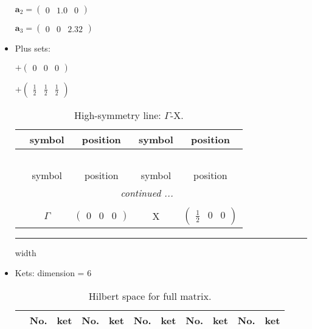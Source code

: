 \documentclass[fleqn,10pt,landscape]{article}
\begin{document}
\begin{itemize}
\quad $\bm{a}_2=\begin{pmatrix} 0 & 1.0 & 0 \end{pmatrix}$

\quad $\bm{a}_3=\begin{pmatrix} 0 & 0 & 2.32 \end{pmatrix}$

\item Plus sets:

\quad $+\begin{pmatrix} 0 & 0 & 0 \end{pmatrix}$

\quad $+\begin{pmatrix} \frac{1}{2} & \frac{1}{2} & \frac{1}{2} \end{pmatrix}$

\begin{center}
\renewcommand{\arraystretch}{1.3}
\begin{longtable}{c|cc|cc}
\caption{High-symmetry line: $\Gamma$-X.}
 \\
 \hline \hline
 & symbol & position & symbol & position \\ \hline \endfirsthead

\multicolumn{4}{l}{\tablename\ \thetable{}} \\
 \hline \hline
 & symbol & position & symbol & position \\ \hline \endhead

 \hline \hline
\multicolumn{4}{r}{\footnotesize\it continued ...} \\ \endfoot

 \hline \hline
\multicolumn{4}{r}{} \\ \endlastfoot

 & $\Gamma$ & $\begin{pmatrix} 0 & 0 & 0 \end{pmatrix}$ & X & $\begin{pmatrix} \frac{1}{2} & 0 & 0 \end{pmatrix}$ \\
\end{longtable}
\end{center}

 \hfil \hrule height 1mm width \textwidth \hfil

\item Kets: dimension = 6
\begin{center}
\renewcommand{\arraystretch}{1.3}
\begin{longtable}{c|cc|cc|cc|cc|cc}
\caption{Hilbert space for full matrix.}
 \\
 \hline \hline
 & No. & ket & No. & ket & No. & ket & No. & ket & No. & ket \\ \hline \endfirsthead


\end{longtable}
\end{center}
\end{itemize}
\end{document}
